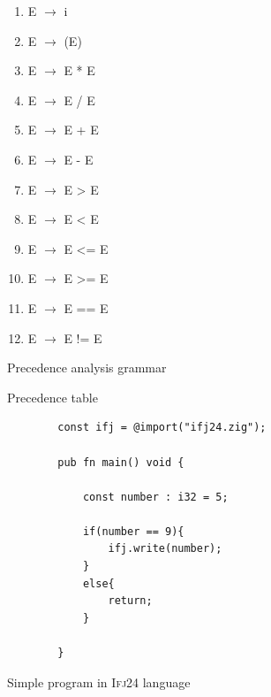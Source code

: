 \documentclass[a4paper, 11pt]{article}
\begin{document}
\begin{figure}[ht]
    \begin{center}
    \begin{enumerate}
        \itemsep-0.5em
        \item E $\to$ i 
        \item E $\to$ (E) 
        \item E $\to$ E * E 
        \item E $\to$ E / E
        \item E $\to$ E + E
        \item E $\to$ E - E
        \item E $\to$ E > E
        \item E $\to$ E < E
        \item E $\to$ E <= E
        \item E $\to$ E >= E
        \item E $\to$ E == E
        \item E $\to$ E != E
    \end{enumerate}
    \caption{Precedence analysis grammar}
    \label{Precedence_grammar}
\end{center}
\end{figure}


\begin{figure}[ht]
    \begin{center}
        \caption{Precedence table}
        \label{prectable}
    \end{center}
\end{figure}

\begin{figure}[ht]
    \begin{verbatim}
        const ifj = @import("ifj24.zig");
    
        pub fn main() void {
        
            const number : i32 = 5;
            
            if(number == 9){
                ifj.write(number);
            }
            else{
                return;
            }
        
        }
        \end{verbatim}
        \caption{Simple program in \textsc{Ifj24} language}
        \label{program}
    \end{figure}
    
\end{document}
